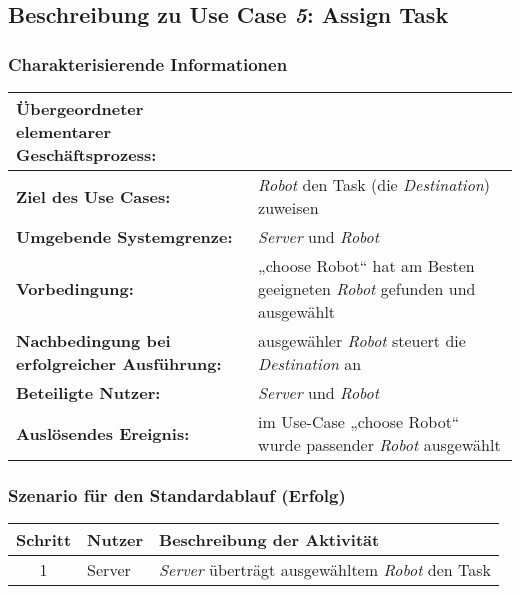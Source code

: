\documentclass[includeheaders]{scrartcl}
\begin{document}

		\subsection{Beschreibung zu Use Case \emph{5}: Assign Task}

			\subsubsection*{Charakterisierende Informationen}
 
			\begin{table}[H]
				\centering
				\begin{tabularx}{\textwidth}{@{}p{5cm}X@{}}
				\toprule
				\textbf{Übergeordneter elementarer Geschäftsprozess:} & \\ \midrule
				\textbf{Ziel des Use Cases:} & \emph{Robot} den Task (die \emph{Destination}) zuweisen\\ \midrule
				\textbf{Umgebende Systemgrenze:} & \emph{Server} und \emph{Robot} \\ \midrule
				\textbf{Vorbedingung:} & „choose Robot“ hat am Besten geeigneten \emph{Robot} gefunden und ausgewählt\\ \midrule
				\textbf{Nachbedingung bei erfolgreicher Ausführung:} & ausgewähler \emph{Robot} steuert die \emph{Destination} an\\ \midrule
				\textbf{Beteiligte Nutzer:} & \emph{Server} und \emph{Robot}\\ \midrule
				\textbf{Auslösendes Ereignis:} & im Use-Case „choose Robot“ wurde passender \emph{Robot} ausgewählt\\ 
				\bottomrule
				\end{tabularx}
			\end{table}
			
			\subsubsection*{Szenario für den Standardablauf (Erfolg)}

			\begin{table}[H]
				\centering
				\begin{tabularx}{\textwidth}{@{}cp{2cm}X@{}}
				\toprule
				Schritt & Nutzer & Beschreibung der Aktivität \\ \midrule
				1 & Server & \emph{Server} überträgt ausgewähltem \emph{Robot} den Task \\
				\bottomrule
				\end{tabularx}
			\end{table}
\end{document}
